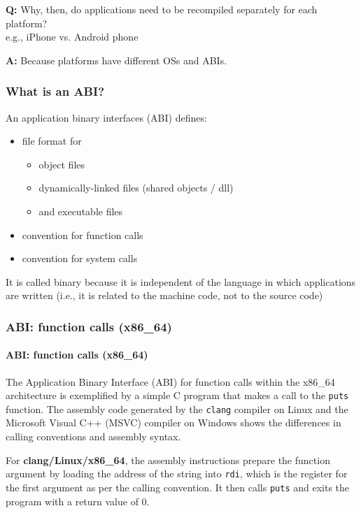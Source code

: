 \documentclass[12pt]{article}
\begin{document}
\textbf{Q:} Why, then, do applications need to be recompiled separately for each platform?\\
e.g., iPhone vs. Android phone

\textbf{A:} Because platforms have different OSs and ABIs.
\subsubsection{What is an ABI?}

An application binary interfaces (ABI) defines:
\begin{itemize}
    \item file format for
    \begin{itemize}
        \item object files
        \item dynamically-linked files (shared objects / dll)
        \item and executable files
    \end{itemize}
    \item convention for function calls
    \item convention for system calls
\end{itemize}

It is called binary because it is independent of the language in which applications are written (i.e., it is related to the machine code, not to the source code)

\subsubsection{ABI: function calls (x86\_64)}

\paragraph{ABI: function calls (x86\_64)}

The Application Binary Interface (ABI) for function calls within the x86\_64 architecture is exemplified by a simple C program that makes a call to the \texttt{puts} function. The assembly code generated by the \texttt{clang} compiler on Linux and the Microsoft Visual C++ (MSVC) compiler on Windows shows the differences in calling conventions and assembly syntax.

For \textbf{clang/Linux/x86\_64}, the assembly instructions prepare the function argument by loading the address of the string into \texttt{rdi}, which is the register for the first argument as per the calling convention. It then calls \texttt{puts} and exits the program with a return value of 0.
\end{document}
